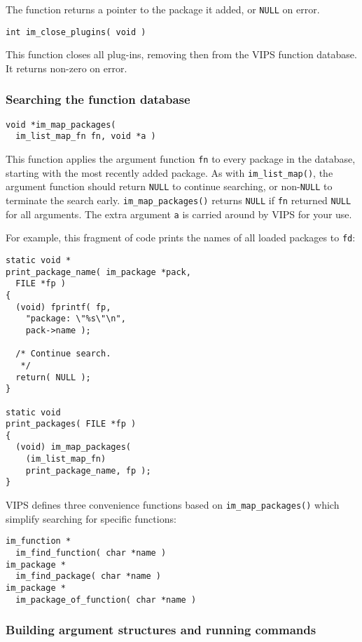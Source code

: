 The function returns a pointer to the package it added, or \verb+NULL+
on error.

\begin{verbatim}
int im_close_plugins( void )
\end{verbatim}

This function closes all plug-ins, removing then from the VIPS function
database. It returns non-zero on error.

\subsubsection{Searching the function database}

\begin{verbatim}
void *im_map_packages( 
  im_list_map_fn fn, void *a )
\end{verbatim}

This function applies the argument function \verb+fn+ to every package
in the database, starting with the most recently added package. As with
\verb+im_list_map()+, the argument function should return \verb+NULL+
to continue searching, or non-\verb+NULL+ to terminate the search
early. \verb+im_map_packages()+ returns \verb+NULL+ if \verb+fn+ returned
\verb+NULL+ for all arguments. The extra argument \verb+a+ is carried around
by VIPS for your use.

For example, this fragment of code prints the names of all loaded packages
to \verb+fd+:

\begin{verbatim}
static void *
print_package_name( im_package *pack, 
  FILE *fp )
{
  (void) fprintf( fp, 
    "package: \"%s\"\n", 
    pack->name );

  /* Continue search.
   */
  return( NULL );
}

static void
print_packages( FILE *fp )
{
  (void) im_map_packages( 
    (im_list_map_fn) 
    print_package_name, fp );
}
\end{verbatim}

VIPS defines three convenience functions based on \verb+im_map_packages()+
which simplify searching for specific functions:

\begin{verbatim}
im_function *
  im_find_function( char *name )
im_package *
  im_find_package( char *name )
im_package *
  im_package_of_function( char *name )
\end{verbatim}

\subsubsection{Building argument structures and running commands}

